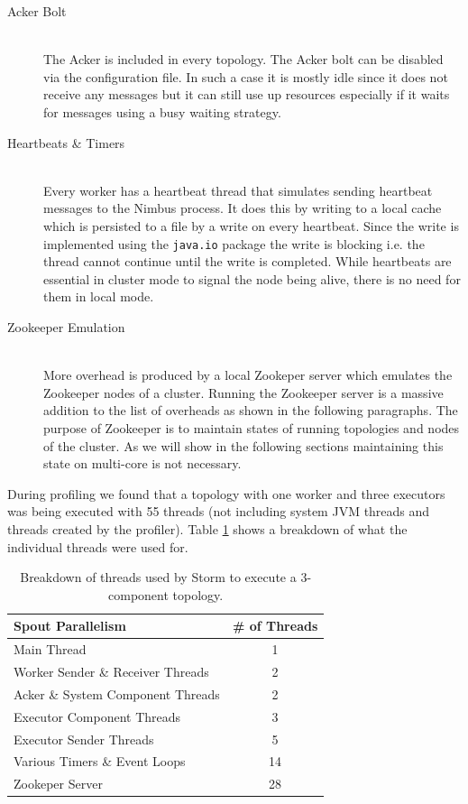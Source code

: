 \begin{description}
	\item[Acker Bolt] \hfill \\
	The Acker is included in every topology. The Acker bolt can be disabled via the configuration file. In such a case it is mostly idle since it does not receive any messages but it can still use up resources especially if it waits for messages using a busy waiting strategy.
	\item[Heartbeats \& Timers] \hfill \\
	Every worker has a heartbeat thread that simulates sending heartbeat messages to the Nimbus process. It does this by writing to a local cache which is persisted to a file by a write on every heartbeat. Since the write is implemented using the \texttt{java.io} package the write is blocking i.e. the thread cannot continue until the write is completed. While heartbeats are essential in cluster mode to signal the node being alive, there is no need for them in local mode.
	\item[Zookeeper Emulation] \hfill \\
	More overhead is produced by a local Zookeper server which emulates the Zookeeper nodes of a cluster. Running the Zookeeper server is a massive addition to the list of overheads as shown in the following paragraphs. The purpose of Zookeeper is to maintain states of running topologies and nodes of the cluster. As we will show in the following sections maintaining this state on multi-core is not necessary.
\end{description}

During profiling we found that a topology with one worker and three executors was being executed with 55 threads (not including system JVM threads and threads created by the profiler). Table \ref{table:breakdown} shows a breakdown of what the individual threads were used for.

\begin{table}[h!]
\centering
\begin{tabular}{@{}lc@{}}
    \textbf{Spout Parallelism} & \textbf{\# of Threads} \\ \toprule
    Main Thread & 1  \\
	Worker Sender \& Receiver Threads & 2  \\
    Acker \& System Component Threads & 2  \\
    Executor Component Threads & 3  \\
    Executor Sender Threads & 5  \\
    Various Timers \& Event Loops & 14  \\
    Zookeper Server & 28  \\
\end{tabular}
\caption{Breakdown of threads used by Storm to execute a 3-component topology.}
\label{table:breakdown}
\end{table}

